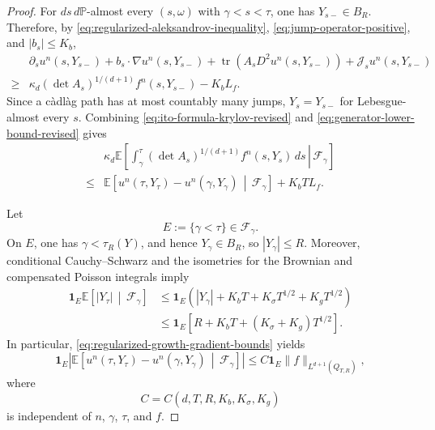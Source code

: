 \documentclass[10pt,a4paper]{amsart}
\begin{document}
\begin{proof}
	For \(ds\,d\mathbb P\)-almost every \((s,\omega)\) with
	\(\gamma<s<\tau\), one has \(Y_{s-}\in B_R\). Therefore, by
	\eqref{eq:regularized-aleksandrov-inequality},
	\eqref{eq:jump-operator-positive}, and \(|b_s|\leq K_b\),
	\begin{equation}
		\label{eq:generator-lower-bound-revised}
		\begin{aligned}
			&\partial_su^n(s,Y_{s-})
			+b_s\cdot\nabla u^n(s,Y_{s-})
			+\operatorname{tr}\!\left(
			A_sD^2u^n(s,Y_{s-})
			\right)
			+\mathcal J_su^n(s,Y_{s-})
			\\
			\geq&
			\kappa_d(\det A_s)^{1/(d+1)}
			f^n(s,Y_{s-})
			-K_bL_f.
		\end{aligned}
	\end{equation}
	Since a c\`adl\`ag path has at most countably many jumps,
	\(Y_s=Y_{s-}\) for Lebesgue-almost every \(s\). Combining
	\eqref{eq:ito-formula-krylov-revised} and
	\eqref{eq:generator-lower-bound-revised} gives
	\begin{equation}
		\label{eq:preliminary-weighted-bound-revised}
		\begin{aligned}
			&\kappa_d
			\mathbb E\left[
			\left.
			\int_\gamma^\tau
			(\det A_s)^{1/(d+1)}
			f^n(s,Y_s)\,ds
			\,\right|\,
			\mathcal F_\gamma
			\right]
			\\
			\leq&
			\mathbb E\left[
			u^n(\tau,Y_\tau)
			-u^n(\gamma,Y_\gamma)
			\,\middle|\,
			\mathcal F_\gamma
			\right]
			+K_bTL_f.
		\end{aligned}
	\end{equation}
	
	Let
	\[
	E:=\{\gamma<\tau\}\in\mathcal F_\gamma.
	\]
	On \(E\), one has \(\gamma<\tau_R(Y)\), and hence
	\(Y_\gamma\in B_R\), so \(|Y_\gamma|\leq R\).
	Moreover, conditional Cauchy--Schwarz and the isometries for the
	Brownian and compensated Poisson integrals imply
	\begin{equation}
		\label{eq:conditional-terminal-moment-revised}
		\begin{aligned}
			\mathbf1_E
			\mathbb E\left[
			|Y_\tau|
			\,\middle|\,
			\mathcal F_\gamma
			\right]
			&\leq
			\mathbf1_E
			\left(
			|Y_\gamma|
			+K_bT
			+K_\sigma T^{1/2}
			+K_gT^{1/2}
			\right)
			\\
			&\leq
			\mathbf1_E
			\left[
			R+K_bT
			+(K_\sigma+K_g)T^{1/2}
			\right].
		\end{aligned}
	\end{equation}
	In particular,
	\eqref{eq:regularized-growth-gradient-bounds} yields
	\begin{equation}
		\label{eq:terminal-test-function-bound-revised}
		\mathbf1_E
		\left|
		\mathbb E\left[
		u^n(\tau,Y_\tau)
		-u^n(\gamma,Y_\gamma)
		\,\middle|\,
		\mathcal F_\gamma
		\right]
		\right|
		\leq
		C\mathbf1_E
		\|f\|_{L^{d+1}(Q_{T,R})},
	\end{equation}
	where
	\[
	C=C(d,T,R,K_b,K_\sigma,K_g)
	\]
	is independent of \(n\), \(\gamma\), \(\tau\), and \(f\).
	

\end{proof}
\end{document}
